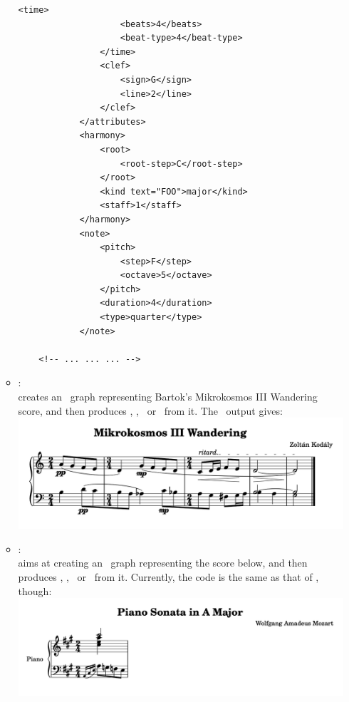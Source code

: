 \begin{itemize}
\begin{itemize}
\begin{lstlisting}[language=MusicXML]
                <time>
                    <beats>4</beats>
                    <beat-type>4</beat-type>
                </time>
                <clef>
                    <sign>G</sign>
                    <line>2</line>
                </clef>
            </attributes>
            <harmony>
                <root>
                    <root-step>C</root-step>
                </root>
                <kind text="FOO">major</kind>
                <staff>1</staff>
            </harmony>
            <note>
                <pitch>
                    <step>F</step>
                    <octave>5</octave>
                </pitch>
                <duration>4</duration>
                <type>quarter</type>
            </note>

	<!-- ... ... ... -->
\end{lstlisting}


\item {}: \\
creates an \msrRepr\ graph representing Bartok's Mikrokosmos III Wandering score, and then produces \lily, \braille, \mxml\ or \guido\ from it. The \lily\ output gives:\\
\includegraphics[scale=0.7]{../graphics/Mikrokosmos_III_Wandering.png}

\item {}: \\
aims at creating an \lpsrRepr\ graph representing the score below, and then produces \lily, \braille, \mxml\ or \guido\ from it. Currently, the code is the same as that of , though:\\
\includegraphics[scale=0.7]{../graphics/LilyPondIssue34.png}
\end{itemize}



\end{itemize}
